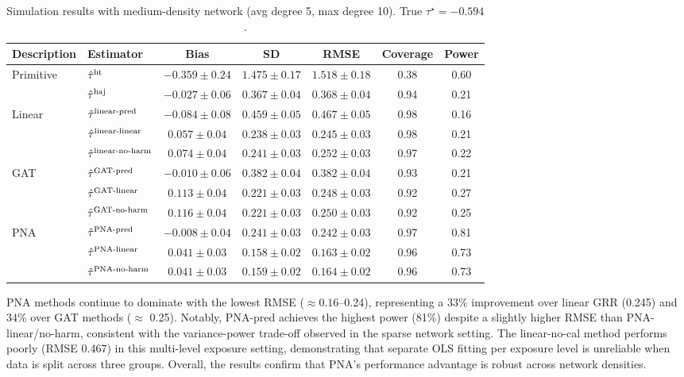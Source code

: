 \documentclass{article}
\theoremstyle{plain}
\theoremstyle{definition}
\theoremstyle{remark}
\newcommand{\hort}{\textup{ht}}
\newcommand{\haj}{\textup{haj}}
\begin{document}
\begin{table}[h]
    \centering
    \caption{Simulation results with medium-density network (avg degree 5, max degree 10). True $\tau^\star = -0.594$.}
    \small
    \begin{tabular}{ll|ccc|cc}
        \toprule
        Description & Estimator & Bias & SD & RMSE & Coverage & Power \\
        \midrule
        Primitive  & $\hat\tau^{\hort}$ & $-0.359 \pm 0.24$ & $1.475 \pm 0.17$ & $1.518 \pm 0.18$ & 0.38 & 0.60 \\
        & $\hat\tau^{\haj}$ & $-0.027 \pm 0.06$ & $0.367 \pm 0.04$ & $0.368 \pm 0.04$ & 0.94 & 0.21 \\
        \midrule
        Linear  
        & $\hat\tau^{\textup{linear-pred}}$ & $-0.084 \pm 0.08$ & $0.459 \pm 0.05$ & $0.467 \pm 0.05$ & 0.98 & 0.16 \\
        & $\hat\tau^{\textup{linear-linear}}$ & $0.057 \pm 0.04$ & $0.238 \pm 0.03$ & $0.245 \pm 0.03$ & 0.98 & 0.21 \\
        & $\hat\tau^{\textup{linear-no-harm}}$ & $0.074 \pm 0.04$ & $0.241 \pm 0.03$ & $0.252 \pm 0.03$ & 0.97 & 0.22 \\
        \midrule
        GAT
        & $\hat\tau^{\textup{GAT-pred}}$ & $-0.010 \pm 0.06$ & $0.382 \pm 0.04$ & $0.382 \pm 0.04$ & 0.93 & 0.21 \\
        & $\hat\tau^{\textup{GAT-linear}}$ & $0.113 \pm 0.04$ & $0.221 \pm 0.03$ & $0.248 \pm 0.03$ & 0.92 & 0.27 \\
        & $\hat\tau^{\textup{GAT-no-harm}}$ & $0.116 \pm 0.04$ & $0.221 \pm 0.03$ & $0.250 \pm 0.03$ & 0.92 & 0.25 \\
        \midrule
        PNA 
        & $\hat\tau^{\textup{PNA-pred}}$ & $\mathbf{-0.008 \pm 0.04}$ & $\mathbf{0.241 \pm 0.03}$ & $\mathbf{0.242 \pm 0.03}$ & 0.97 & 0.81 \\
        & $\hat\tau^{\textup{PNA-linear}}$ & $\mathbf{0.041 \pm 0.03}$ & $\mathbf{0.158 \pm 0.02}$ & $\mathbf{0.163 \pm 0.02}$ & 0.96 & 0.73 \\
        & $\hat\tau^{\textup{PNA-no-harm}}$ & $\mathbf{0.041 \pm 0.03}$ & $\mathbf{0.159 \pm 0.02}$ & $\mathbf{0.164 \pm 0.02}$ & 0.96 & 0.73 \\
        \bottomrule
    \end{tabular}
    \label{tab::simu_out2_results}
\end{table}

PNA methods continue to dominate with the lowest RMSE ($\approx 0.16$--0.24), representing a 33\% improvement over linear GRR (0.245) and 34\% over GAT methods ($\approx$ 0.25). Notably, PNA-pred achieves the highest power (81\%) despite a slightly higher RMSE than PNA-linear/no-harm, consistent with the variance-power trade-off observed in the sparse network setting. The linear-no-cal method performs poorly (RMSE 0.467) in this multi-level exposure setting, demonstrating that separate OLS fitting per exposure level is unreliable when data is split across three groups. Overall, the results confirm that PNA's performance advantage is robust across network densities.
\end{document}
